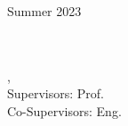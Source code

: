 \begin{titlepage}
\begin{center}
\begin{normalsize}
\begin{flushleft}
		\vspace{30pt}
		\centering
		Summer 2023

	\end{flushleft}
	\end{normalsize}
	
	\end{center}
	\vspace*{\fill}
	\singlespacing
	\cleardoublepage


	\vfill
\end{titlepage}


\hfill
\vfill
{
	\small
	\textbf{\thesisName} \\
	\textit{\thesisTitle} \\
	\thesisSubject, \thesisDate \\
	Supervisors: Prof. \thesisFirstSupervisor\ \\
	Co-Supervisors: Eng. \thesisCoSupervisor\ \\[1.5em]
	\textbf{\thesisUniversity} \\
	\textit{\thesisUniversityGroup} \\
	\thesisUniversityDepartment \\
	\thesisUniversityCity
}
